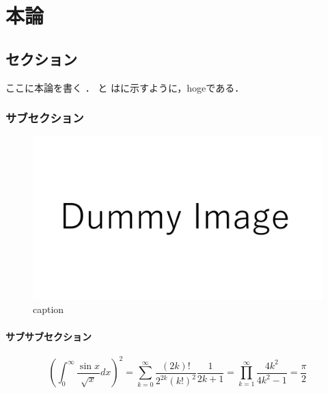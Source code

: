 \documentclass[main]{subfiles}
\begin{document}
\chapter{本論}
\section{セクション}
ここに本論を書く \cite{ref:yao2017integrated} \cite{ref:ugarte1992curling} \cite{ref:nomura2022uwb}．
と はに示すように，hogeである．

\subsection{サブセクション}

\begin{figure}[htbp]
    \centering
    \includegraphics[keepaspectratio, width=\linewidth]{figures/dummy.pdf}
    \caption{caption}
    \label{fig:label}
\end{figure}

\subsubsection{サブサブセクション}



\begin{equation}
    \left( \int_{0}^\infty \frac{\sin x}{\sqrt {x}} dx \right)^{2}
    = \sum_{k = 0}^\infty \frac{(2k)!}{2^{2k}(k!)^{2}} \frac{1}{2k + 1}
    = \prod_{k = 1}^\infty \frac{4k^{2}}{4k^{2} - 1} = \frac{\pi}{2}
    \label{eq:label}
\end{equation}
\end{document}
